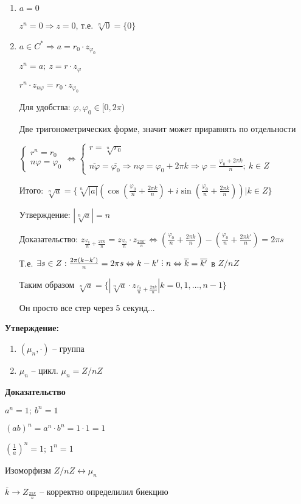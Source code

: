 \documentclass[14pt, letter paper]{article}
\def\divby{%
  \mathrel{\text{\vbox{\baselineskip.65ex\lineskiplimit0pt\hbox{.}\hbox{.}\hbox{.}}}}%
}
\begin{document}
\begin{enumerate}
    \item $a = 0$
    
    $z^n = 0 \Rightarrow z = 0$, т.е. $\sqrt[n]{0} = \{0\}$

    \item $a \in C^* \Rightarrow a = r_0 \cdot z_{\varphi_0}$
    
    $z^n = a;\ z = r \cdot z_\varphi$

    $r^n \cdot z_{n\varphi} = r_0 \cdot z_{\varphi_0}$

    Для удобства: $\varphi, \varphi_0 \in [0, 2\pi)$

    Две тригонометрических форме, значит может приравнять по отдельности

    $\begin{cases}
        r^n = r_0 \\
        n\varphi = \varphi_0
    \end{cases} \Leftrightarrow \begin{cases}
        r = \sqrt[n]{r_0} \\
        \overline{n\varphi} = \overline{\varphi_0} \Rightarrow n\varphi = \varphi_0 + 2\pi k \Rightarrow \varphi = \frac{\varphi_0 + 2\pi k}{n};\ k \in Z
    \end{cases}$

    Итого: $\sqrt[n]{a} = \{\sqrt[n]{|a|}(\cos(\frac{\varphi_0}{n} + \frac{2\pi k}{n}) + i\sin(\frac{\varphi_0}{n} + \frac{2\pi k}{n})) | k \in Z\}$

    Утверждение: $|\sqrt[n]{a}| = n$

    Доказательство: $z_{\frac{\varphi_0}{n} + \frac{2\pi k}{n}} = z_{\frac{\varphi_0}{n}} \cdot z_{\frac{2\pi k'}{n}} \Leftrightarrow (\frac{\varphi_0}{n} + \frac{2\pi k}{n}) - (\frac{\varphi_0}{n} + \frac{2\pi k'}{n}) = 2\pi s$

    Т.е. $\exists s \in Z : \frac{2 \pi (k - k')}{n} = 2\pi s \Leftrightarrow k - k' \divby n \Leftrightarrow \overline{k} = \overline{k'}$ в $Z/nZ$

    Таким образом $\sqrt[n]{a} = \{ |\sqrt[n]{a} \cdot z_{\frac{\varphi_0}{n} + \frac{2\pi k}{n}} | k = 0, 1, \ldots, n - 1\}$ 

    Он просто все стер через 5 секунд...
\end{enumerate}

\textbf{Утверждение:} 

\begin{enumerate}
    \item $(\mu_n, \cdot)$ -- группа
    \item $\mu_n$ -- цикл. $\mu_n = Z/nZ$
\end{enumerate}

\begin{center}
    \textbf{Доказательство}
\end{center}

$a^n = 1;\ b^n = 1$

$(ab)^n = a^n \cdot b^n = 1 \cdot 1 = 1$

$(\frac{1}{a})^n = 1;\ 1^n = 1$

Изоморфизм $Z/nZ \leftrightarrow \mu_n$

$\overline{k} \rightarrow Z_{\frac{2\pi k}{n}}$ -- корректно определилил биекцию
\end{document}
